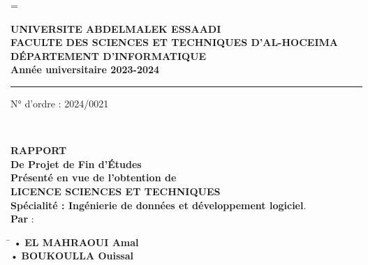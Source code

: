 
\thispagestyle{empty} %
\emergencystretch=\maxdimen
{}
\makeatletter



\begin{titlepage}


\begin{center}
{\small \textbf{UNIVERSITE ABDELMALEK ESSAADI}\\
\textbf{FACULTE DES SCIENCES ET TECHNIQUES D’AL-HOCEIMA}\\
\textbf{DÉPARTEMENT D’INFORMATIQUE}\\
\textbf{Année universitaire 2023-2024}\\}
\end{center}


\hrule
\vspace{0.09cm}

\begin{flushright}
N° d’ordre : 2024/0021
\end{flushright}\\
\begin{center}
{\LARGE \textbf{RAPPORT}\\[0.2cm]}
{\Large \textbf{De Projet de Fin d'Études}}\\[1.5cm]

{\large \textbf{Présenté en vue de l'obtention de}}\\[0.3cm]
{\Large \textbf{LICENCE SCIENCES ET TECHNIQUES}}\\[0.3cm]
{\large \textbf{Spécialité : Ingénierie de données et développement logiciel}.}\\[1.5cm]

{\large \textbf{Par} :}\\[0.5cm]

    \begin{tabbing}
        \hspace{4cm} \= \kill
        • \textbf{EL MAHRAOUI Amal}   \\
        • \textbf{BOUKOULLA Ouissal} \\
    \end{tabbing}




\end{center}
\end{titlepage}
